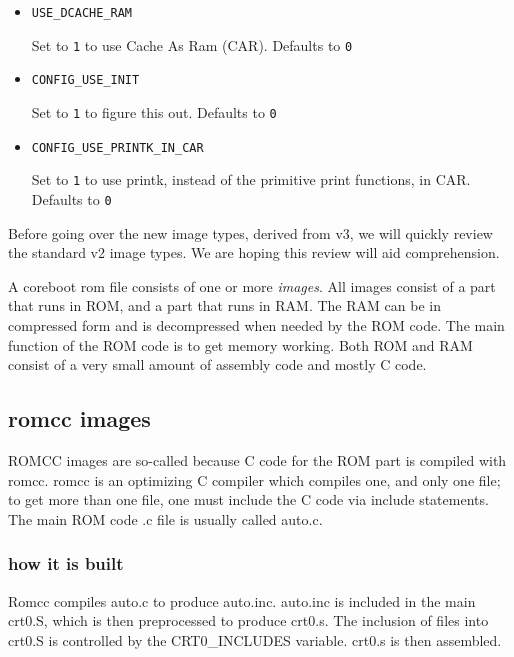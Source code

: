 \documentclass[titlepage,12pt]{article}
\begin{document}
\begin{itemize}
\item \begin{verbatim}USE_DCACHE_RAM\end{verbatim}

Set to \texttt{1} to use Cache As Ram (CAR). Defaults to \texttt{0}

\item \begin{verbatim}CONFIG_USE_INIT\end{verbatim}

Set to \texttt{1} to figure this out. Defaults to \texttt{0}

\item \begin{verbatim}CONFIG_USE_PRINTK_IN_CAR\end{verbatim}

Set to \texttt{1} to use printk, instead of the primitive print functions, in CAR. Defaults to \texttt{0}

\end{itemize}

Before going over the new image types, derived from v3, we will quickly review the standard v2 image types. We are hoping this review will
aid comprehension. 

A coreboot rom file consists of one or more \textit{images}. All images consist of a part that runs in ROM, and a part that runs in RAM. The RAM can be in  compressed form and is decompressed when needed by the ROM code. The main function of the ROM code is to get memory working. Both ROM and RAM consist of a very small amount of assembly code and mostly C code. 

\subsection{romcc images}
ROMCC images are so-called because C code for the ROM part is compiled with romcc. romcc is an optimizing C compiler which compiles one, and only 
one file; to get more than one file, one must include the C code via include statements. The main ROM code .c file is usually called auto.c. 
\subsubsection{how it is built}
Romcc compiles auto.c to produce auto.inc. auto.inc is included in the main crt0.S, which is then preprocessed to produce crt0.s. The inclusion of files into crt0.S is controlled by the CRT0\_INCLUDES variable. crt0.s is then assembled. 
\end{document}
